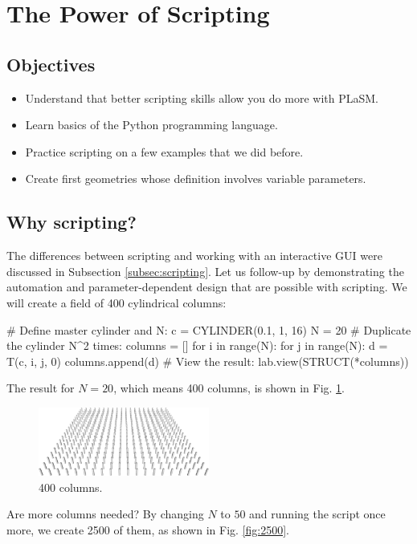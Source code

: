 \section{The Power of Scripting}

\subsection{Objectives}
\begin{itemize}
\item Understand that better scripting skills allow you do more with PLaSM.
\item Learn basics of the Python programming language.
\item Practice scripting on a few examples that we did before.
\item Create first geometries whose definition involves variable parameters.
\end{itemize}

\subsection{Why scripting?}

The differences between scripting and working with an interactive GUI 
were discussed in Subsection \ref{subsec:scripting}. Let us follow-up
by demonstrating the automation and parameter-dependent design that are 
possible with scripting. We will create a field of 400 cylindrical columns:

\begin{bluecode}
# Define master cylinder and N:
c = CYLINDER(0.1, 1, 16)
N = 20
# Duplicate the cylinder N^2 times:
columns = []
for i in range(N):
  for j in range(N):
    d = T(c, i, j, 0)
    columns.append(d)
# View the result:
lab.view(STRUCT(*columns)) 
\end{bluecode}
The result for $N = 20$, which means 400 columns, is shown 
in Fig. \ref{fig:400}.\\

\begin{figure}[!ht]
\begin{center}
\includegraphics[width=0.5\textwidth]{img/400.png}
\end{center}
\vspace{-4mm}
\caption{400 columns.}
\label{fig:400}
\end{figure}
\noindent
Are more columns needed? By changing $N$ to $50$ and running the script
once more, we create 2500 of them, as shown in Fig. \ref{fig:2500}.
\newpage

